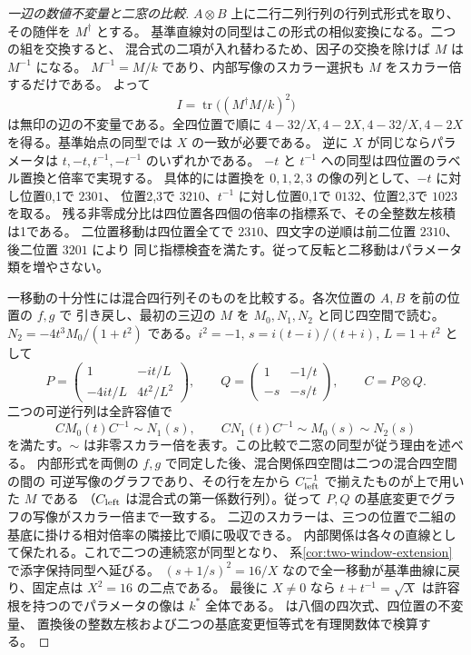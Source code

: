\begin{proof}[一辺の数値不変量と二窓の比較]
$A\otimes B$ 上に二行二列行列の行列式形式を取り、その随伴を $M^\dagger$ とする。
基準直線対の同型はこの形式の相似変換になる。二つの組を交換すると、
混合式の二項が入れ替わるため、因子の交換を除けば $M$ は $M^{-1}$ になる。
$M^{-1}=M/k$ であり、内部写像のスカラー選択も $M$ をスカラー倍するだけである。
よって
\[
            I=\operatorname{tr}\big((M^\dagger M/k)^2\big)
\]
は無印の辺の不変量である。全四位置で順に
$4-32/X,4-2X,4-32/X,4-2X$ を得る。基準始点の同型では $X$ の一致が必要である。
逆に $X$ が同じならパラメータは $t,-t,t^{-1},-t^{-1}$ のいずれかである。
$-t$ と $t^{-1}$ への同型は四位置のラベル置換と倍率で実現する。
具体的には置換を $0,1,2,3$ の像の列として、$-t$ に対し位置0,1で $2301$、
位置2,3で $3210$、$t^{-1}$ に対し位置0,1で $0132$、位置2,3で $1023$ を取る。
残る非零成分比は四位置各四個の倍率の指標系で、その全整数左核積は1である。
二位置移動は四位置全てで $2310$、四文字の逆順は前二位置 $2310$、後二位置 $3201$ により
同じ指標検査を満たす。従って反転と二移動はパラメータ類を増やさない。

一移動の十分性には混合四行列そのものを比較する。各次位置の $A,B$ を前の位置の $f,g$ で
引き戻し、最初の三辺の $M$ を $M_0,N_1,N_2$ と同じ四空間で読む。
$N_2=-4t^3M_0/(1+t^2)$ である。$i^2=-1$, $s=i(t-i)/(t+i)$, $L=1+t^2$ として
\[
 P=\begin{pmatrix}1&-it/L\\-4it/L&4t^2/L^2\end{pmatrix},
 \qquad Q=\begin{pmatrix}1&-1/t\\-s&-s/t\end{pmatrix},\qquad C=P\otimes Q .
\]
二つの可逆行列は全許容値で
\[
 C M_0(t) C^{-1}\sim N_1(s),\qquad
 C N_1(t) C^{-1}\sim M_0(s)\sim N_2(s)
\]
を満たす。$\sim$ は非零スカラー倍を表す。この比較で二窓の同型が従う理由を述べる。
内部形式を両側の $f,g$ で同定した後、混合関係四空間は二つの混合四空間の間の
可逆写像のグラフであり、その行を左から $C_{\rm left}^{-1}$ で揃えたものが上で用いた $M$ である
（$C_{\rm left}$ は混合式の第一係数行列）。従って $P,Q$ の基底変更でグラフの写像がスカラー倍まで一致する。
二辺のスカラーは、三つの位置で二組の基底に掛ける相対倍率の隣接比で順に吸収できる。
内部関係は各々の直線として保たれる。これで二つの連続窓が同型となり、
系\ref{cor:two-window-extension}で添字保持同型へ延びる。
$(s+1/s)^2=16/X$ なので全一移動が基準曲線に戻り、固定点は $X^2=16$ の二点である。
最後に $X\ne0$ なら $t+t^{-1}=\sqrt X$ は許容根を持つのでパラメータの像は $k^*$ 全体である。
 は八個の四次式、四位置の不変量、
置換後の整数左核および二つの基底変更恒等式を有理関数体で検算する。
\end{proof}
